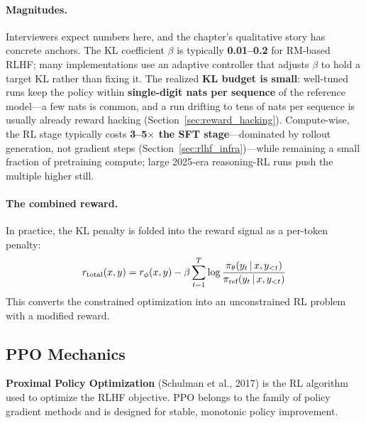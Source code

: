 \paragraph{Magnitudes.}
Interviewers expect numbers here, and the chapter's qualitative story has
concrete anchors.  The KL coefficient $\beta$ is typically
\textbf{0.01--0.2} for RM-based RLHF; many implementations use an adaptive
controller that adjusts $\beta$ to hold a target KL rather than fixing it.
The realized \textbf{KL budget is small}: well-tuned runs keep the policy
within \textbf{single-digit nats per sequence} of the reference model---a
few nats is common, and a run drifting to tens of nats per sequence is
usually already reward hacking (Section~\ref{sec:reward_hacking}).
Compute-wise, the RL stage typically costs \textbf{3--5$\times$ the SFT
stage}---dominated by rollout generation, not gradient steps
(Section~\ref{sec:rlhf_infra})---while remaining a small fraction of
pretraining compute; large 2025-era reasoning-RL runs push the multiple
higher still.

\paragraph{The combined reward.}
In practice, the KL penalty is folded into the reward signal as a per-token
penalty:
\begin{equation}
r_{\text{total}}(x, y)
= r_\phi(x, y)
  - \beta \sum_{t=1}^{T} \log \frac{\pi_\theta(y_t \,|\, x, y_{<t})}
                                     {\pi_{\text{ref}}(y_t \,|\, x, y_{<t})}
\label{eq:total_reward}
\end{equation}
This converts the constrained optimization into an unconstrained RL problem
with a modified reward.

\subsection{PPO Mechanics}

\textbf{Proximal Policy Optimization} (Schulman et al., 2017) is the RL
algorithm used to optimize the RLHF objective.  PPO belongs to the family
of policy gradient methods and is designed for stable, monotonic policy
improvement.

